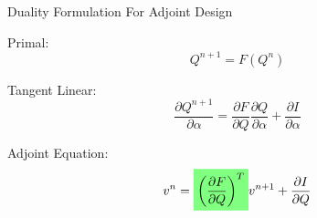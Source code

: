 \begin{frame}{Duality Formulation For Adjoint Design}
\begin{block}{Primal:}
\begin{equation}
Q^{n+1}=F(Q^n)
\end{equation}
\end{block}
\begin{block}{Tangent Linear:}
\begin{equation}
\frac{\partial Q^{n+1}}{\partial \alpha} = \frac{\partial F}{\partial Q}\frac{\partial Q}{\partial \alpha} +\frac{\partial I}{\partial \alpha}
\end{equation}
\end{block}

\begin{block}{Adjoint Equation:}
\begin{equation}
v^n = \highlight{\left(\frac{\partial F}{\partial Q}\right)^{T}}v^{n+1} +\frac{\partial I}{\partial Q}
\end{equation}
\end{block}


\end{frame}

